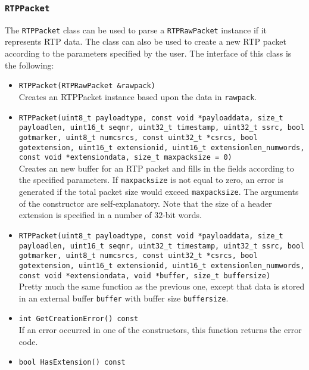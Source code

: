 \documentclass[12pt,a4paper]{article}
\newcommand{\headerfile}[1]{\marginpar{\scriptsize Header:\\{\tt #1}}}
\begin{document}
			\subsubsection{\tt RTPPacket}\headerfile{rtppacket.h}
	
				The {\tt RTPPacket} class can be used to parse a {\tt RTPRawPacket}
				instance if it represents RTP data. The class can also be used to
				create a new RTP packet according to the parameters specified by
				the user. The interface of this class is the following:
				\begin{itemize}
					\item {\tt RTPPacket(RTPRawPacket \&rawpack)}\\
						Creates an RTPPacket instance based upon the data in
						{\tt rawpack}.
					\item {\tt RTPPacket(uint8\_t payloadtype, const void *payloaddata, size\_t payloadlen, uint16\_t seqnr,
									uint32\_t timestamp, uint32\_t ssrc, bool gotmarker, uint8\_t numcsrcs, const uint32\_t *csrcs,
									bool gotextension, uint16\_t extensionid, uint16\_t extensionlen\_numwords, const void *extensiondata,
									size\_t maxpacksize = 0)}\\
						Creates an new buffer for an RTP packet and fills in the fields
						according to the specified parameters. If {\tt maxpacksize} is
						not equal to zero, an error is generated if the total packet size
						would exceed {\tt maxpacksize}. The arguments of the constructor
						are self-explanatory. Note that the size of a header extension is
						specified in a number of $32$-bit words.
					\item {\tt RTPPacket(uint8\_t payloadtype, const void *payloaddata, size\_t payloadlen, uint16\_t seqnr,
									uint32\_t timestamp, uint32\_t ssrc, bool gotmarker, uint8\_t numcsrcs, const uint32\_t *csrcs,
									bool gotextension, uint16\_t extensionid, uint16\_t extensionlen\_numwords, const void *extensiondata,
									void *buffer, size\_t buffersize)}\\
						Pretty much the same function as the previous one, except that data is stored
						in an external buffer {\tt buffer} with buffer size {\tt buffersize}.
					\item {\tt int GetCreationError() const}\\
						If an error occurred in one of the constructors, this function
						returns the error code.
					\item {\tt bool HasExtension() const}\\

\end{itemize}
\end{document}
